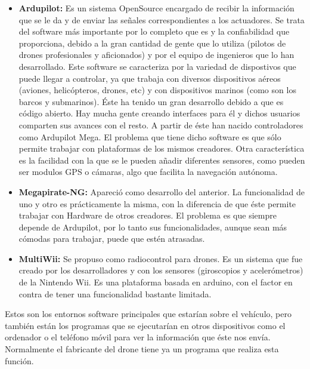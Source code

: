 	\begin{itemize}
		\item \textbf{Ardupilot:} Es un sistema OpenSource encargado de recibir la informaci\'on que se le da y de enviar las señales correspondientes a los actuadores. Se trata del software m\'as importante por lo completo que es y la confiabilidad que proporciona, debido a la gran cantidad de gente que lo utiliza (pilotos de drones profesionales y aficionados) y por el equipo de ingenieros que lo han desarrollado. Este software se caracteriza por la variedad de dispostivos que puede llegar a controlar, ya que trabaja con diversos dispositivos a\'ereos (aviones, helic\'opteros, drones, etc) y con dispositivos marinos (como son los barcos y submarinos). \'Este ha tenido un gran desarrollo debido a que es c\'odigo abierto. Hay mucha gente creando interfaces para \'el y dichos usuarios comparten sus avances con el resto. A partir de \'este han nacido controladores como Ardupilot Mega. El problema que tiene dicho software es que s\'olo permite trabajar con plataformas de los mismos creadores. Otra caracter\'istica es la facilidad con la que se le pueden añadir diferentes sensores, como pueden ser modulos GPS o c\'amaras, algo que facilita la navegaci\'on aut\'onoma. 

	\item \textbf{Megapirate-NG:} Apareci\'o como desarrollo del anterior. La funcionalidad de uno y otro es pr\'acticamente la misma, con la diferencia de que \'este permite trabajar con Hardware de otros creadores. El problema es que siempre depende de Ardupilot, por lo tanto sus funcionalidades, aunque sean m\'as c\'omodas para trabajar, puede que est\'en atrasadas.

		\item \textbf{MultiWii:} Se propuso como radiocontrol para drones. Es un sistema que fue creado por los desarrolladores y con los sensores (giroscopios y aceler\'ometros) de la Nintendo Wii. Es una plataforma basada en arduino, con el factor en contra de tener una funcionalidad bastante limitada. 
	\end{itemize}


Estos son los entornos software principales que estar\'ian sobre el veh\'iculo, pero tambi\'en est\'an los programas que se ejecutar\'ian en otros dispositivos como el ordenador o el tel\'efono m\'ovil para ver la informaci\'on que \'este nos env\'ia. Normalmente el fabricante del drone tiene ya un programa que realiza esta funci\'on. 

